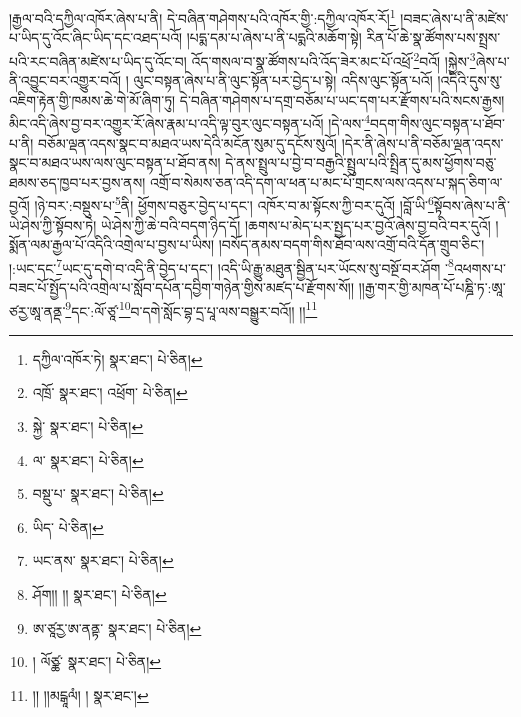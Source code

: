།རྒྱལ་བའི་དཀྱིལ་འཁོར་ཞེས་པ་ནི། དེ་བཞིན་གཤེགས་པའི་འཁོར་གྱི་:དཀྱིལ་འཁོར་རོ།\footnote{དཀྱིལ་འཁོར་ཏེ།  སྣར་ཐང་།  པེ་ཅིན། } །བཟང་ཞེས་པ་ནི་མཛེས་པ་ཡིད་དུ་འོང་ཞིང་ཡིད་དང་འཐད་པའོ། །པདྨ་དམ་པ་ཞེས་པ་ནི་པདྨའི་མཆོག་སྟེ། རིན་པོ་ཆེ་སྣ་ཚོགས་པས་སྤྲས་པའི་རང་བཞིན་མཛེས་པ་ཡིད་དུ་འོང་བ། འོད་གསལ་བ་སྣ་ཚོགས་པའི་འོད་ཟེར་མང་པོ་འཕྲོ་\footnote{འཁྲོ་  སྣར་ཐང་། འཕྲོག་  པེ་ཅིན། }བའོ། །སྐྱེས་\footnote{སྐྱེ་  སྣར་ཐང་།  པེ་ཅིན། }ཞེས་པ་ནི་འབྱུང་བར་འགྱུར་བའོ། །
ལུང་བསྟན་ཞེས་པ་ནི་ལུང་སྟོན་པར་བྱེད་པ་སྟེ། འདིས་ལུང་སྟོན་པའོ། །འདིའི་དུས་སུ་འཇིག་རྟེན་གྱི་ཁམས་ཆེ་གེ་མོ་ཞིག་ཏུ། དེ་བཞིན་གཤེགས་པ་དགྲ་བཅོམ་པ་ཡང་དག་པར་རྫོགས་པའི་སངས་རྒྱས། མིང་འདི་ཞེས་བྱ་བར་འགྱུར་རོ་ཞེས་རྣམ་པ་འདི་ལྟ་བུར་ལུང་བསྟན་པའོ། །དེ་ལས་\footnote{ལ་  སྣར་ཐང་།  པེ་ཅིན། }བདག་གིས་ལུང་བསྟན་པ་ཐོབ་པ་ནི། བཅོམ་ལྡན་འདས་སྣང་བ་མཐའ་ཡས་དེའི་མངོན་སུམ་དུ་དངོས་སུའོ། །དེར་ནི་ཞེས་པ་ནི་བཅོམ་ལྡན་འདས་སྣང་བ་མཐའ་ཡས་ལས་ལུང་བསྟན་པ་ཐོབ་ནས། དེ་ནས་སྤྲུལ་པ་བྱེ་བ་བརྒྱའི་སྤྲུལ་པའི་སྤྲིན་དུ་མས་ཕྱོགས་བཅུ་ཐམས་ཅད་ཁྱབ་པར་བྱས་ནས། འགྲོ་བ་སེམས་ཅན་འདི་དག་ལ་ཕན་པ་མང་པོ་གྲངས་ལས་འདས་པ་སྐད་ཅིག་ལ་བྱའོ། །ཉེ་བར་:བསྡུས་པ་\footnote{བསྡུ་པ་  སྣར་ཐང་།  པེ་ཅིན། }ནི། ཕྱོགས་བཅུར་བྱེད་པ་དང་། འཁོར་བ་མ་སྟོངས་ཀྱི་བར་དུའོ། །བློ་ཡི་\footnote{ཡིད་  པེ་ཅིན། }སྟོབས་ཞེས་པ་ནི་ཡེ་ཤེས་ཀྱི་སྟོབས་ཏེ། ཡེ་ཤེས་ཀྱི་ཆེ་བའི་བདག་ཉིད་དོ། །ཆགས་པ་མེད་པར་སྤྱད་པར་བྱའོ་ཞེས་བྱ་བའི་བར་དུའོ། །སྨོན་ལམ་རྒྱལ་པོ་འདིའི་འགྲེལ་པ་བྱས་པ་ཡིས། །བསོད་ནམས་བདག་གིས་ཐོབ་ལས་འགྲོ་བའི་དོན་གྲུབ་ཅིང་། །:ཡང་དང་\footnote{ཡང་ནས་  སྣར་ཐང་།  པེ་ཅིན། }ཡང་དུ་དགེ་བ་འདི་ནི་བྱེད་པ་དང་། །འདི་ཡི་རྒྱུ་མཐུན་སྦྱིན་པར་ཡོངས་སུ་བསྔོ་བར་ཤོག ་\footnote{ཤོག།། །།  སྣར་ཐང་།  པེ་ཅིན། }འཕགས་པ་བཟང་པོ་སྤྱོད་པའི་འགྲེལ་པ་སློབ་དཔོན་དབྱིག་གཉེན་གྱིས་མཛད་པ་རྫོགས་སོ།། །།རྒྱ་གར་གྱི་མཁན་པོ་པཎྜི་ཏ་:ཨཱ་ཙརྱ་ཨཱ་ནནྡ་\footnote{ཨ་ཙཱརྱ་ཨ་ནནྟ་  སྣར་ཐང་།  པེ་ཅིན། }དང་:ལོ་ཙཱ་\footnote{། ལོཙྪ་  སྣར་ཐང་།  པེ་ཅིན། }བ་དགེ་སློང་བྷ་དྲ་པཱ་ལས་བསྒྱུར་བའོ།། །།\footnote{།། །།མངྒཱལཾ། །  སྣར་ཐང་། }